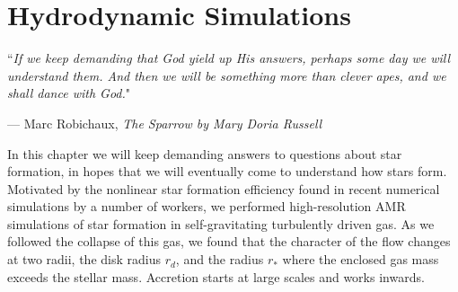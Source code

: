 \documentclass[../dissertation.tex]{subfiles}
\begin{document}
\chapter{Hydrodynamic Simulations}
\label{ch:hydro}

\singlespace
\epigraph{``\emph{If we keep demanding that God yield up His answers, perhaps some day we will understand them. And then we will be something more than clever apes, and we shall dance with God.}"}{--- \textup{Marc Robichaux}, \textit{The Sparrow by Mary Doria Russell}}

\dblspace

%
In this chapter we will keep demanding answers to questions about star formation, in hopes that we will eventually  come to understand how stars form.
Motivated by the nonlinear star formation efficiency found in recent numerical simulations by a number of workers, we performed high-resolution AMR simulations of star formation in self-gravitating turbulently driven gas. 
As we followed the collapse of this gas, we found that the character of the flow changes at two radii, the disk radius $r_d$, and the radius $r_*$ where the enclosed gas mass exceeds the stellar mass. 
Accretion starts at large scales and works inwards. 
\end{document}

